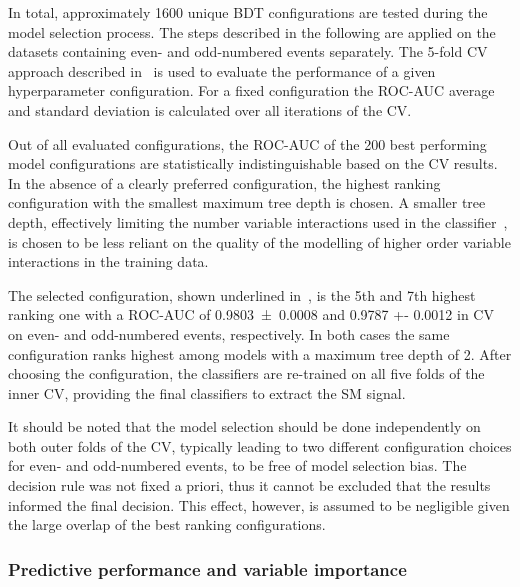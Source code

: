 In total, approximately 1600 unique BDT configurations are tested
during the model selection process. The steps described in the
following are applied on the datasets containing even- and
odd-numbered events separately. The 5-fold CV approach described
in~ is used to evaluate the performance
of a given hyperparameter configuration. For a fixed configuration the
ROC-AUC average and standard deviation is calculated over all
iterations of the CV.

Out of all evaluated configurations, the ROC-AUC of the 200 best
performing model configurations are statistically indistinguishable
based on the CV results. In the absence of a clearly preferred
configuration, the highest ranking configuration with the smallest
maximum tree depth is chosen. A smaller tree depth, effectively
limiting the number variable interactions used in the
classifier~\cite{hastie09}, is chosen to be less reliant on the
quality of the modelling of higher order variable interactions in the
training data.

The selected configuration, shown underlined
in~, is the 5th and 7th highest
ranking one with a ROC-AUC of \num{0.9803 +- 0.0008} and \num{0.9787
  +- 0.0012} in CV on even- and odd-numbered events, respectively. In
both cases the same configuration ranks highest among models with a
maximum tree depth of 2.  After choosing the configuration, the
classifiers are re-trained on all five folds of the inner CV,
providing the final classifiers to extract the SM \HH signal.

It should be noted that the model selection should be done
independently on both outer folds of the CV, typically leading to two
different configuration choices for even- and odd-numbered events, to
be free of model selection bias. The decision rule was not fixed a
priori, thus it cannot be excluded that the results informed the final
decision. This effect, however, is assumed to be negligible given the
large overlap of the best ranking configurations.



\subsubsection{Predictive performance and variable importance}
\label{sec:bdt_performance}

